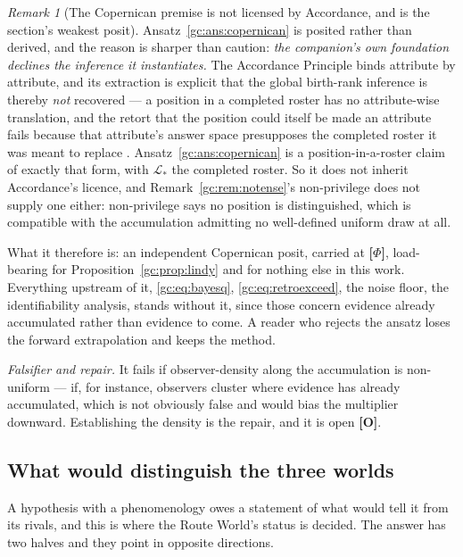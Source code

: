 \documentclass[11pt]{article}
\numberwithin{equation}{section}
\theoremstyle{plain}
\theoremstyle{definition}
\theoremstyle{remark}
\newtheorem{remark}[theorem]{Remark}
\newcommand{\Lc}{\mathcal{L}}
\begin{document}
\begin{remark}[The Copernican premise is not licensed by Accordance, and
is the section's weakest posit]\label{gc:rem:copernicancost}
Ansatz~\ref{gc:ans:copernican} is posited rather than derived, and the reason is sharper than caution: \emph{the companion's
own foundation declines the inference it instantiates.} The Accordance Principle binds attribute by attribute, and its extraction
is explicit that the global birth-rank inference is thereby \emph{not}
recovered --- a position in a completed roster has no attribute-wise
translation, and the retort that the position could itself be made an
attribute fails because that attribute's answer space presupposes the
completed roster it was meant to replace \cite{NexicFoundation}.
Ansatz~\ref{gc:ans:copernican} is a position-in-a-roster claim of
exactly that form, with $\Lc_\ast$ the completed roster. So it does not
inherit Accordance's licence, and Remark~\ref{gc:rem:notense}'s non-privilege
does not supply one either: non-privilege says no position is
distinguished, which is compatible with the accumulation admitting no
well-defined uniform draw at all.

What it therefore is: an independent Copernican posit, carried at
\textbf{[$\Phi$]}, load-bearing for
Proposition~\ref{gc:prop:lindy} and for nothing else in this work.
Everything upstream of it, \eqref{gc:eq:bayesq},
\eqref{gc:eq:retroexceed}, the noise floor, the identifiability
analysis, stands without it, since those concern evidence already
accumulated rather than evidence to come. A reader who rejects the
ansatz loses the forward extrapolation and keeps the method.

\emph{Falsifier and repair.} It fails if observer-density along
the accumulation is non-uniform --- if, for instance, observers cluster
where evidence has already accumulated, which is not obviously false and
would bias the multiplier downward. Establishing the density is the
repair, and it is open \textbf{[O]}.
\end{remark}

\subsection{What would distinguish the three worlds}
\label{gc:sub:discriminate}

A hypothesis with a phenomenology owes a statement of what would tell it
from its rivals, and this is where the Route World's status is decided.
The answer has two halves and they point in opposite directions.
\end{document}
